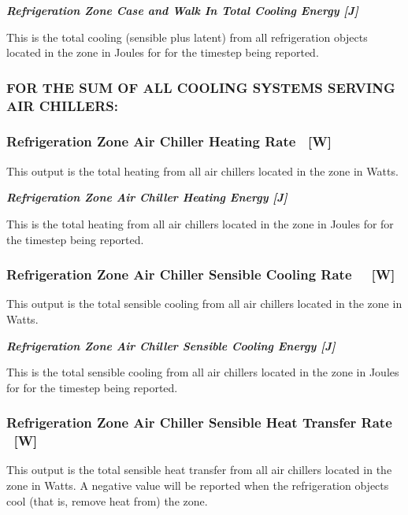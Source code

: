 \textbf{\emph{Refrigeration Zone Case and Walk In Total Cooling Energy {[}J{]}}}

This is the total cooling (sensible plus latent) from all refrigeration objects located in the zone in Joules for for the timestep being reported.

\subsubsection{FOR THE SUM OF ALL COOLING SYSTEMS SERVING AIR CHILLERS:}\label{for-the-sum-of-all-cooling-systems-serving-air-chillers}

\subsubsection{Refrigeration Zone Air Chiller Heating Rate ~{[}W{]}}\label{refrigeration-zone-air-chiller-heating-rate-w}

This output is the total heating from all air chillers located in the zone in Watts.

\textbf{\emph{Refrigeration Zone Air Chiller Heating Energy {[}J{]}}}

This is the total heating from all air chillers located in the zone in Joules for for the timestep being reported.

\subsubsection{Refrigeration Zone Air Chiller Sensible Cooling Rate~~ {[}W{]}}\label{refrigeration-zone-air-chiller-sensible-cooling-rate-w}

This output is the total sensible cooling from all air chillers located in the zone in Watts.

\textbf{\emph{Refrigeration Zone Air Chiller Sensible Cooling Energy {[}J{]}}}

This is the total sensible cooling from all air chillers located in the zone in Joules for for the timestep being reported.

\subsubsection{Refrigeration Zone Air Chiller Sensible Heat Transfer Rate ~{[}W{]}}\label{refrigeration-zone-air-chiller-sensible-heat-transfer-rate-w}

This output is the total sensible heat transfer from all air chillers located in the zone in Watts. A negative value will be reported when the refrigeration objects cool (that is, remove heat from) the zone.

